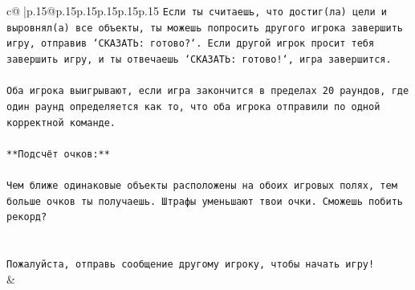 \documentclass{article}
\begin{document}
{\begin{supertabular}{c@{$\;$}|p{.15\linewidth}@{}p{.15\linewidth}p{.15\linewidth}p{.15\linewidth}p{.15\linewidth}p{.15\linewidth}}
{{{\texttt{Если ты считаешь, что достиг(ла) цели и выровнял(а) все объекты, ты можешь попросить другого игрока завершить игру, отправив `СКАЗАТЬ: готово?`. Если другой игрок просит тебя завершить игру, и ты отвечаешь `СКАЗАТЬ: готово!`, игра завершится.} \\
\\ 
\texttt{Оба игрока выигрывают, если игра закончится в пределах 20 раундов, где один раунд определяется как то, что оба игрока отправили по одной корректной команде.} \\
\\ 
\texttt{**Подсчёт очков:**} \\
\\ 
\texttt{Чем ближе одинаковые объекты расположены на обоих игровых полях, тем больше очков ты получаешь. Штрафы уменьшают твои очки. Сможешь побить рекорд?} \\
\\ 
\\ 
\texttt{Пожалуйста, отправь сообщение другому игроку, чтобы начать игру!} \\
            }
        }
    }
    & \\ \\


\end{supertabular}}
\end{document}
